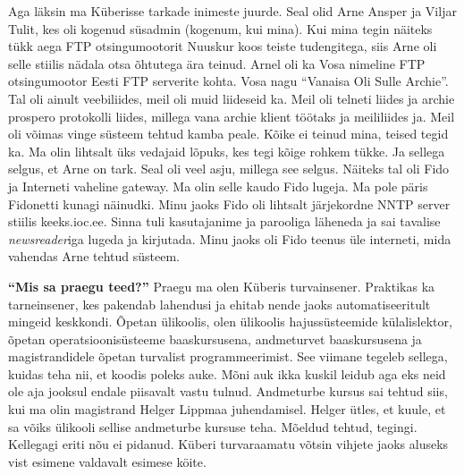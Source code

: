 Aga läksin ma Küberisse tarkade inimeste juurde. Seal olid Arne Ansper ja Viljar Tulit, kes oli kogenud süsadmin (kogenum, kui mina). Kui mina tegin näiteks tükk aega FTP otsingumootorit Nuuskur koos teiste tudengitega, siis Arne oli selle stiilis nädala otsa õhtutega ära teinud. Arnel oli ka Vosa nimeline FTP otsingumootor Eesti FTP serverite kohta. Vosa nagu \enquote{Vanaisa Oli Sulle Archie}. Tal oli ainult veebiliides, meil oli muid liideseid ka. Meil oli telneti liides ja archie prospero protokolli liides, millega vana archie klient töötaks ja meililiides ja. Meil oli võimas vinge süsteem tehtud kamba peale. Kõike ei teinud mina, teised tegid ka. Ma olin lihtsalt üks vedajaid lõpuks, kes tegi kõige rohkem tükke. Ja sellega selgus, et Arne on tark. Seal oli veel asju, millega see selgus. Näiteks tal oli Fido ja Interneti vaheline gateway. Ma olin selle kaudo Fido lugeja. Ma pole päris Fidonetti kunagi näinudki. Minu jaoks Fido oli lihtsalt järjekordne NNTP server stiilis keeks.ioc.ee. Sinna tuli kasutajanime ja parooliga läheneda ja sai tavalise \emph{newsreader}iga lugeda ja kirjutada. Minu jaoks oli Fido teenus üle interneti, mida vahendas Arne tehtud süsteem. 

\textbf{\enquote{Mis sa praegu teed?}}
Praegu ma olen Küberis turvainsener. Praktikas ka tarneinsener, kes pakendab lahendusi ja ehitab nende jaoks automatiseeritult mingeid keskkondi. Õpetan ülikoolis, olen ülikoolis hajussüsteemide külalislektor, õpetan operatsioonisüsteeme baaskursusena, andmeturvet baaskursusena ja magistrandidele õpetan turvalist programmeerimist. See viimane tegeleb sellega, kuidas teha nii, et koodis poleks auke. Mõni auk ikka kuskil leidub aga eks neid ole aja jooksul endale piisavalt vastu tulnud. Andmeturbe kursus sai tehtud siis, kui ma olin magistrand Helger Lippmaa juhendamisel. Helger ütles, et kuule, et sa võiks ülikooli  sellise andmeturbe kursuse teha. Mõeldud tehtud, tegingi. Kellegagi eriti nõu ei pidanud. Küberi turvaraamatu võtsin vihjete jaoks aluseks vist esimene valdavalt esimese köite. 


